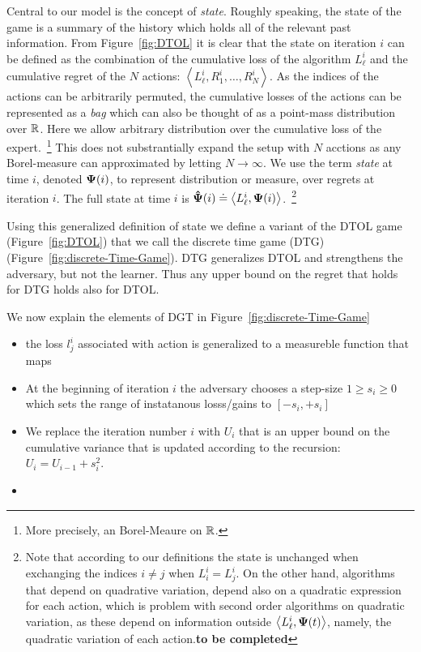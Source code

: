 \documentclass{article}[12pt]
\begin{document}
Central to our model is the concept of {\em state}. Roughly speaking,
the state of the game is a summary of the history which holds all of
the relevant past information. From Figure~\ref{fig:DTOL} it is clear
that the state on iteration $i$ can be defined as the combination of
the cumulative loss of the algorithm $L_\ell^i$ and the cumulative
regret of the $N$ actions:
$\left\langle L^i_\ell,R_1^i,\ldots,R_N^i \right\rangle$. As the
indices of the actions can be arbitrarily permuted, the cumulative
losses of the actions can be represented as a {\em bag} which can also
be thought of as a point-mass distribution over $\mathbb{R}$. Here we
allow arbitrary distribution over the cumulative loss of the
expert.~\footnote{More precisely, an Borel-Meaure on $\mathbb{R}$.} This
does not substrantially expand the setup with $N$ acctions as any
Borel-measure can approximated by letting $N \to \infty$. We use the
term {\em state} at time $i$, denoted ${\bf \Psi}(i)$, to represent
distribution or measure, over regrets at iteration $i$.  The full
state at time $i$ is
${\bf \hat{\Psi}}(i) \doteq \left\langle L^i_\ell,{\bf \Psi}(i)
\right\rangle$.~\footnote{Note that according to our definitions the
  state is unchanged when exchanging the indices $i \neq j$ when
  $L_i^i=L_j^i$.  On the other hand, algorithms that depend on
  quadrative variation, depend also on a quadratic expression for each
  action, which is problem with second order algorithms on quadratic
  variation, as these depend on information outside
  $\left\langle L^i_\ell,{\bf \Psi}(t) \right\rangle$, namely, the
  quadratic variation of each action.{\bf to be completed}}

Using this generalized definition of state we define a variant of the
DTOL game (Figure~\ref{fig:DTOL}) that we call the discrete time game (DTG)
(Figure~\ref{fig:discrete-Time-Game}). DTG generalizes DTOL and strengthens the adversary,
but not the learner. Thus any upper bound on the regret that holds for DTG holds also for DTOL. 

We now explain the elements of DGT in Figure~\ref{fig:discrete-Time-Game}
\begin{itemize}
\item the loss $l_j^i$ associated with action is generalized to a measureble function that maps 
\item At the beginning of iteration $i$ the adversary chooses a
  step-size $1 \geq s_i \geq 0$ which sets the range of instatanous
  losss/gains to $[-s_i,+s_i]$
\item We replace the iteration number $i$ with $U_i$ that is an upper
  bound on the cumulative variance that is updated according to the recursion:
  $U_i = U_{i-1}+s_i^2$.
\item  
\end{itemize}
\end{document}
